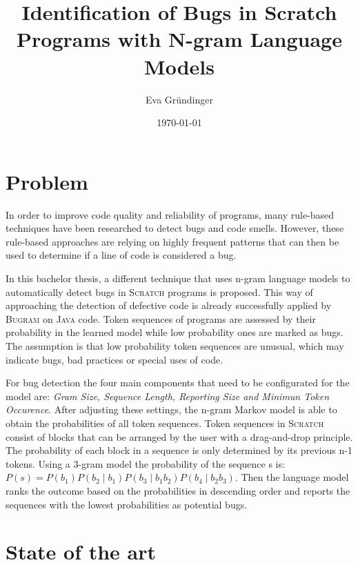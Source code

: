\documentclass[
    numbers=noenddot,
    parskip=half-,
    fontsize=12pt,
    paper=a4,
    oneside,
    titlepage,
    bibliography=totoc,
    chapterprefix=false,
]{scrbook}
\title{Identification of Bugs in Scratch Programs with N-gram Language Models}
\author{Eva Gründinger}
\date{\today}
\newcommand{\bugram}{\textsc{Bugram}}
\newcommand{\scratch}{\textsc{Scratch}}
\newcommand{\java}{\textsc{Java}}
\begin{document}

    \frontmatter
    
    \tableofcontents
    \newpage


    \mainmatter

    \chapter{Problem}\label{ch:problem}
    In order to improve code quality and reliability of programs, many rule-based techniques have been researched to detect bugs and code smells. However, these rule-based approaches are relying on highly frequent patterns that can then be used to determine if a line of code is considered a bug. 
    
    In this bachelor thesis, a different technique that uses n-gram language models to automatically detect bugs in \scratch{} programs is proposed. This way of approaching the detection of defective code is already successfully applied by \bugram{} on \java{} code. Token sequences of programs are assessed by their probability in the learned model while low probability ones are marked as bugs. The assumption is that low probability token sequences are unusual, which may indicate bugs, bad practices or special uses of code. 
    
    For bug detection the four main components that need to be configurated for the model are: \textit{Gram Size, Sequence Length, Reporting Size and Minimun Token Occurence}. After adjusting these settings, the n-gram Markov model is able to obtain the probabilities of all token sequences. Token sequences in \scratch{} consist of blocks that can be arranged by the user with a drag-and-drop principle. The probability of each block in a sequence is only determined by its previous n-1 tokens. Using a 3-gram model the probability of the sequence s is:
    \(P(s) = P(b_{1})P(b_{2}\mid b_{1})P(b_{3}\mid b_{1}b_{2})P(b_{4}\mid b_{2}b_{3}) \). Then the language model ranks the outcome based on the probabilities in descending order and reports the sequences with the lowest probabilities as potential bugs. 
    

    \chapter{State of the art}\label{ch:state-of-the-art}
    
\end{document}
